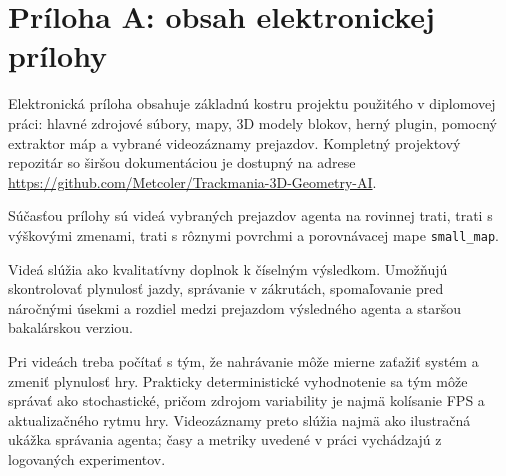 \chapter*{Príloha A: obsah elektronickej prílohy}

Elektronická príloha obsahuje základnú kostru projektu použitého v diplomovej práci: hlavné zdrojové súbory, mapy, 3D modely blokov, herný plugin, pomocný extraktor máp a vybrané videozáznamy prejazdov. Kompletný projektový repozitár so širšou dokumentáciou je dostupný na adrese \url{https://github.com/Metcoler/Trackmania-3D-Geometry-AI}.

Súčasťou prílohy sú videá vybraných prejazdov agenta na rovinnej trati, trati s výškovými zmenami, trati s rôznymi povrchmi a porovnávacej mape \texttt{small\_map}.

Videá slúžia ako kvalitatívny doplnok k číselným výsledkom. Umožňujú skontrolovať plynulosť jazdy, správanie v zákrutách, spomaľovanie pred náročnými úsekmi a rozdiel medzi prejazdom výsledného agenta a staršou bakalárskou verziou.

Pri videách treba počítať s tým, že nahrávanie môže mierne zaťažiť systém a zmeniť plynulosť hry. Prakticky deterministické vyhodnotenie sa tým môže správať ako stochastické, pričom zdrojom variability je najmä kolísanie FPS a aktualizačného rytmu hry. Videozáznamy preto slúžia najmä ako ilustračná ukážka správania agenta; časy a metriky uvedené v práci vychádzajú z logovaných experimentov.

